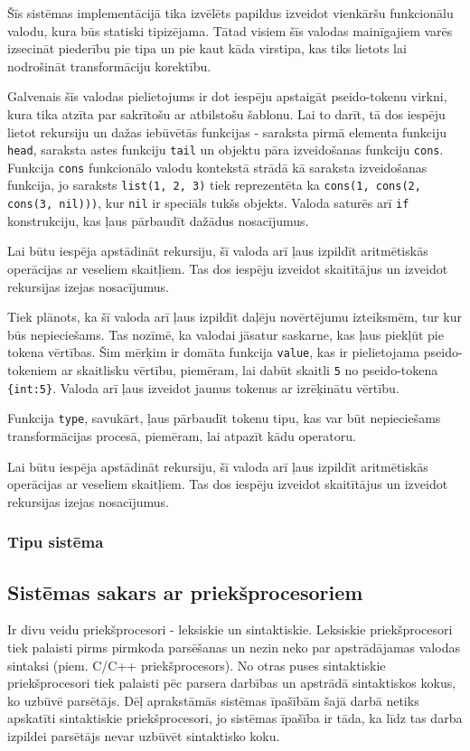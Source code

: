 Šīs sistēmas implementācijā tika izvēlēts papildus izveidot vienkāršu funkcionālu valodu, kura būs statiski tipizējama. Tātad visiem šīs valodas mainīgajiem varēs izsecināt piederību pie tipa un pie kaut kāda virstipa, kas tiks lietots lai nodrošināt transformāciju korektību.

Galvenais šīs valodas pielietojums ir dot iespēju apstaigāt pseido-tokenu virkni, kura tika atzīta par sakrītošu ar atbilstošu šablonu. Lai to darīt, tā dos iespēju lietot rekursiju un dažas iebūvētās funkcijas - saraksta pirmā elementa funkciju \verb|head|, saraksta astes funkciju \verb|tail| un objektu pāra izveidošanas funkciju \verb|cons|. Funkcija \verb|cons| funkcionālo valodu kontekstā strādā kā saraksta izveidošanas funkcija, jo saraksts \verb|list(1, 2, 3)| tiek reprezentēta ka \verb|cons(1, cons(2, cons(3, nil)))|, kur \verb|nil| ir speciāls tukšs objekts. Valoda saturēs arī \verb|if| konstrukciju, kas ļaus pārbaudīt dažādus nosacījumus.

Lai būtu iespēja apstādināt rekursiju, šī valoda arī ļaus izpildīt aritmētiskās operācijas ar veseliem skaitļiem. Tas dos iespēju izveidot skaitītājus un izveidot rekursijas izejas nosacījumus.

Tiek plānots, ka šī valoda arī ļaus izpildīt daļēju novērtējumu izteiksmēm, tur kur būs nepieciešams. Tas nozīmē, ka valodai jāsatur saskarne, kas ļaus piekļūt pie tokena vērtības. Šim mērķim ir domāta funkcija \verb|value|, kas ir pielietojama pseido-tokeniem ar skaitlisku vērtību, piemēram, lai dabūt skaitli \verb|5| no pseido-tokena \verb|{int:5}|. Valoda arī ļaus izveidot jaunus tokenus ar izrēķinātu vērtību.

Funkcija \verb|type|, savukārt, ļaus pārbaudīt tokenu tipu, kas var būt nepieciešams transformācijas procesā, piemēram, lai atpazīt kādu operatoru.

Lai būtu iespēja apstādināt rekursiju, šī valoda arī ļaus izpildīt aritmētiskās operācijas ar veseliem skaitļiem. Tas dos iespēju izveidot skaitītājus un izveidot rekursijas izejas nosacījumus.


\subsubsection{\label{syste_typesystem}Tipu sistēma}


\subsection{Sistēmas sakars ar priekšprocesoriem}
Ir divu veidu priekšprocesori - leksiskie un sintaktiskie. Leksiskie priekšprocesori tiek palaisti pirms pirmkoda parsēšanas un nezin neko par apstrādājamas valodas sintaksi (piem. C/C++ priekšprocesors). No otras puses sintaktiskie priekšprocesori tiek palaisti pēc parsera darbības un apstrādā sintaktiskos kokus, ko uzbūvē parsētājs. Dēļ aprakstāmās sistēmas īpašībām šajā darbā netiks apskatīti sintaktiskie priekšprocesori, jo sistēmas īpašība ir tāda, ka līdz tas darba izpildei parsētājs nevar uzbūvēt sintaktisko koku.


